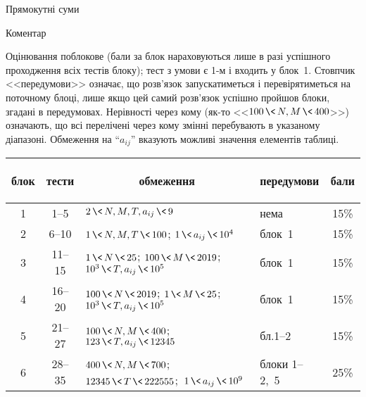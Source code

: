 \begin{problemAllDefault}{Прямокутні суми}
\begin{exampleSimpleThree}{5em}{5em}{19em}{Коментар}
%
\end{exampleSimpleThree}

\Scoring
Оцінювання поблокове (бали за блок нараховуються лише в разі успішного проходження всіх тестів блоку); тест з умови є \mbox{1-м} і входить у блок~1.
Стовпчик <<передумови>> означає, що розв'язок запускатиметься і перевірятиметься на поточному блоці, лише якщо цей самий розв'язок успішно пройшов блоки, згадані в передумовах.
Нерівності через кому (\mbox{як-то} <<${100\,{\<}\,N,M\,{\<}\,400}$>>) означають, що всі перелічені через кому змінні перебувають в указаному діапазоні. Обмеження на ``$a_{ij}$'' вказують можливі 
значення %
елементів таблиці.


\begin{small}

\begin{longtable}{@{}c|c|p{}|p{}|c@{}}
блок\hspace*{-0.01\textwidth}
&
тести
&
\multicolumn{1}{c|}{обмеження}
&\begin{minipage}{0.08\textwidth}\renewcommand\baselinestretch{0.75}\begin{scriptsize}
перед\-умови\par
\end{scriptsize}\end{minipage}
&
бали
\\\hline\hline\endhead
1 & 
1--5 & 
${2\,{\<}\,N,M,T,a_{ij}\,{\<}\,9}$ & 
нема & 
15\% 
\\\hline
2 & 
6--10 & 
${1\,{\<}\,N,M,T\,{\<}\,100}$; ${1\,{\<}\,a_{ij}\,{\<}\,10^4}$ &
блок~1 & 
15\% \\\hline
3 & 
11--15 & 
${1\,{\<}\,N\,{\<}\,25}$; ${100\,{\<}\,M\,{\<}\,2019}$; ${10^3\,{\<}\,T,a_{ij}\,{\<}\,10^5}$ &
блок~1 & 
15\% \\\hline
4 & 
16--20 & 
${100\,{\<}\,N\,{\<}\,2019}$; ${1\,{\<}\,M\,{\<}\,25}$; ${10^3\,{\<}\,T,a_{ij}\,{\<}\,10^5}$ &
блок~1 & 
15\% \\\hline
5 &
21--27 & 
${100\,{\<}\,N,M\,{\<}\,400}$; ${123\,{\<}\,T,a_{ij}\,{\<}\,12345}$ &
бл.\mbox{1--2} & 
15\% \\\hline
6 &
28--35 & 
${400\,{\<}\,N,M\,{\<}\,700}$; ${12345\,{\<}\,T\,{\<}\,222555}$;\hfill~\linebreak ${1\,{\<}\,a_{ij}\,{\<}\,10^9}$ &
блоки \mbox{1--2},~5 & 
25\% \\
\end{longtable}

\end{small}

\end{problemAllDefault}
